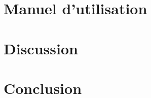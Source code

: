 \documentclass[a4paper,11pt]{report}
\begin{document}
	
	
		
		
		
\chapter{Manuel d'utilisation}

	

	

\chapter{Discussion}

	

	
\chapter{Conclusion}

	

\printglossaries
\end{document}
